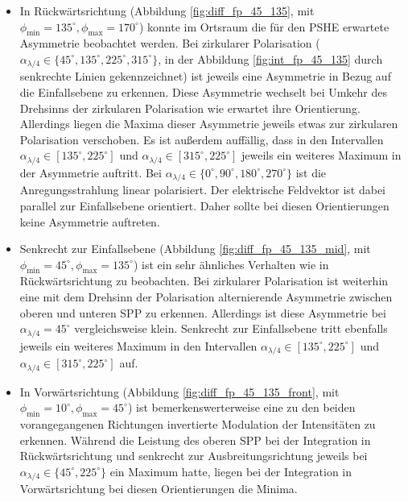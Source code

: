 \documentclass[titlepage,  ngerman]{article}
\begin{document}
			\begin{itemize}
				\item In Rückwärtsrichtung (Abbildung \ref{fig:diff_fp_45_135},  mit $\phi_\mathrm{min} =135^\circ, \phi_\mathrm{max}=170^\circ$) konnte im Ortsraum die für den PSHE erwartete Asymmetrie beobachtet werden. Bei zirkularer Polarisation ($\alpha_{\lambda/4} \in \{45^\circ, 135^\circ, 225^\circ, 315^\circ\}$, in der Abbildung \ref{fig:int_fp_45_135} durch senkrechte Linien gekennzeichnet) ist jeweils eine Asymmetrie in Bezug auf die Einfallsebene zu erkennen. Diese Asymmetrie wechselt bei Umkehr des Drehsinns der zirkularen Polarisation wie erwartet ihre Orientierung. Allerdings liegen die Maxima dieser Asymmetrie jeweils etwas zur zirkularen Polarisation verschoben. Es ist außerdem auffällig, dass in den Intervallen $\alpha_{\lambda/4} \in [135^\circ,225^\circ]$ und $\alpha_{\lambda/4} \in [315^\circ, 225^\circ]$ jeweils ein weiteres Maximum in der Asymmetrie auftritt. Bei $\alpha_{\lambda/4} \in \{0^\circ, 90^\circ, 180^\circ, 270^\circ\}$ ist die Anregungsstrahlung linear polarisiert. Der elektrische Feldvektor ist dabei parallel zur Einfallsebene orientiert. Daher sollte bei diesen Orientierungen keine Asymmetrie auftreten.
				\item Senkrecht zur Einfallsebene (Abbildung \ref{fig:diff_fp_45_135_mid},  mit $\phi_\mathrm{min} =45^\circ, \phi_\mathrm{max}=135^\circ$) ist ein sehr ähnliches Verhalten wie in Rückwärtsrichtung zu beobachten. Bei zirkularer Polarisation ist weiterhin eine mit dem Drehsinn der Polarisation alternierende Asymmetrie zwischen oberen und unteren SPP zu erkennen. Allerdings ist diese Asymmetrie bei $\alpha_{\lambda/4}=45^\circ$ vergleichsweise klein. Senkrecht zur Einfallsebene tritt ebenfalls jeweils ein weiteres Maximum in den Intervallen $\alpha_{\lambda/4} \in [135^\circ,225^\circ]$ und $\alpha_{\lambda/4} \in [315^\circ, 225^\circ]$ auf.
				\item
				In Vorwärtsrichtung (Abbildung \ref{fig:diff_fp_45_135_front},  mit  $\phi_\mathrm{min} =10^\circ, \phi_\mathrm{max}=45^\circ$) ist bemerkenswerterweise eine zu den beiden vorangegangenen Richtungen invertierte Modulation der Intensitäten zu erkennen. Während die Leistung des oberen SPP bei der Integration in Rückwärtsrichtung und senkrecht zur Ausbreitungsrichtung jeweils bei $\alpha_{\lambda /4} \in \{45^\circ, 225^\circ\}$ ein Maximum hatte, liegen bei der Integration in Vorwärtsrichtung bei diesen Orientierungen die Minima.
			\end{itemize}
\end{document}

